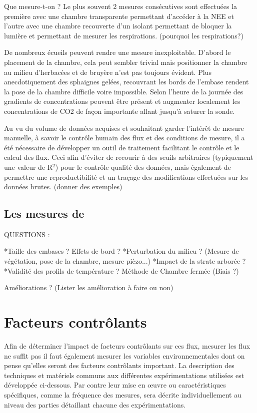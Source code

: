 Que mesure-t-on ?
Le plus souvent 2 mesures consécutives sont effectuées la première avec une chambre transparente permettant d'accéder à la NEE et l'autre avec une chambre recouverte d'un isolant permettant de bloquer la lumière et permettant de mesurer les respirations. (pourquoi les respirations?)

De nombreux écueils peuvent rendre une mesure inexploitable. D'abord le placement de la chambre, cela peut sembler trivial mais positionner la chambre au milieu d'herbacées et de bruyère n'est pas toujours évident. Plus anecdotiquement des sphaignes gelées, recouvrant les bords de l'embase rendent la pose de la chambre difficile voire impossible. Selon l'heure de la journée des gradients de concentrations peuvent être présent et augmenter localement les concentrations de CO2 de façon importante allant jusqu'à saturer la sonde.

Au vu du volume de données acquises et souhaitant garder l'intérêt de mesure manuelle, à savoir le contrôle humain des flux et des conditions de mesure, il a été nécessaire de développer un outil de traitement facilitant le contrôle et le calcul des flux.
Ceci afin d'éviter de recourir à des seuils arbitraires (typiquement une valeur de R$^{2}$) pour le contrôle qualité des données, mais également de permettre une reproductibilité et un traçage des modifications effectuées sur les données brutes.
(donner des exemples)

\subsection{Les mesures de \chh}

QUESTIONS :

*Taille des embases ? Effets de bord ?
*Perturbation du milieu ? (Mesure de végétation, pose de la chambre, mesure pièzo...)
*Impact de la strate arborée ?
*Validité des profils de température ?
Méthode de Chambre fermée (Biais ?)

Améliorations ? (Lister les amélioration à faire ou non)


\section{Facteurs contrôlants}
Afin de déterminer l'impact de facteurs contrôlants sur ces flux, mesurer les flux ne suffit pas il faut également mesurer les variables environnementales dont on pense qu'elles seront des facteurs contrôlants important.
La description des techniques et matériels communs aux différentes expérimentations utilisées est développée ci-dessous.
Par contre leur mise en œuvre ou caractéristiques spécifiques, comme la fréquence des mesures, sera décrite individuellement au niveau des parties détaillant chacune des expérimentations.

